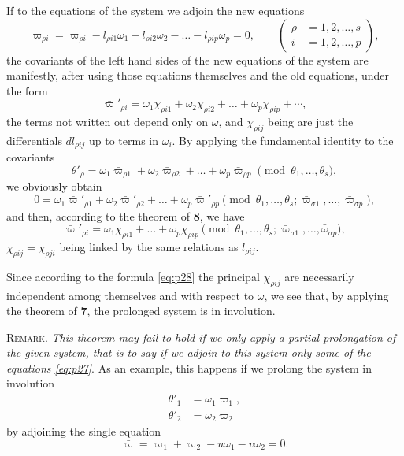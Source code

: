 \documentclass[leqno,11pt]{book}
\theoremstyle{shape1}
\theoremstyle{shapesmall}
\newcommand{\vp}{\varpi}
\newcommand{\somespace}{\vspace{9pt}}
\begin{document}
If to the equations of the system we adjoin the new equations
\begin{equation}
  \label{eq:p27}
  \bar\vp_{\rho i}=\vp_{\rho i}-l_{\rho i1}\omega_{1}-l_{\rho i2}\omega_{2}-\dots-l_{\rho ip}\omega_{p}=0,\qquad
  \left(\begin{aligned}
    \rho&=1,2,\dots,s\\
    i&=1,2,\dots,p
  \end{aligned}\right),
\end{equation}
the covariants of the left hand sides of the new equations of the system are manifestly, after using those equations themselves and the old equations, under the form
\begin{equation}
  \label{eq:p28}
  \bar\vp'_{\rho i}=\omega_{1}\chi_{\rho i1}+\omega_{2}\chi_{\rho i 2}+\dots+\omega_{p}\chi_{\rho ip}+\cdots,
\end{equation}
the terms not written out depend only on $\omega$, and $\chi_{\rho ij}$ being are just the differentials $dl_{\rho ij}$ up to terms in $\omega_{i}$. By applying the fundamental identity to the covariants
\[
\theta'_{\rho}=\omega_{1}\bar\vp_{\rho 1}+\omega_{2}\bar\vp_{\rho 2}+\dots+\omega_{p}\bar\vp_{\rho p}\pmod{\theta_{1},\dots,\theta_{s}},
\]
we obviously obtain
\[
0=\omega_{1}\bar\vp'_{\rho 1}+\omega_{2}\bar\vp'_{\rho 2}+\dots+\omega_{p}\bar\vp'_{\rho p}\pmod{\theta_{1},\dots,\theta_{s};\bar\vp_{\sigma 1},\dots,\bar\vp_{\sigma p}},
\]
and then, according to the theorem of \textsection\textbf{8}, we have
\begin{equation}
  \label{eq:p29}
  \bar\vp'_{\rho i}=\omega_{1}\chi_{\rho i1}+\dots+\omega_{p}\chi_{\rho ip}\pmod{\theta_{1},\dots,\theta_{s};\bar\vp_{\sigma 1},\dots,\bar\omega_{\sigma p}},
\end{equation}
$\chi_{\rho ij}=\chi_{\rho ji}$ being linked by the same relations as $l_{\rho ij}$.

Since according to the formula \eqref{eq:p28} the principal $\chi_{\rho ij}$ are necessarily independent among themselves and with respect to $\omega$, we see that, by applying the theorem of \textsection\textbf{7}, the prolonged system is in involution.

\somespace

\textsc{Remark.} \emph{This theorem may fail to hold if we only apply a partial prolongation of the given system, that is to say if we adjoin to this system only some of the equations \eqref{eq:p27}}. As an example, this happens if we prolong the system in involution
\begin{align*}
  \theta'_{1}&=\omega_{1}\vp_{1},\\
  \theta'_{2}&=\omega_{2}\vp_{2}
\end{align*}
by adjoining the single equation
\[
\bar\vp=\vp_{1}+\vp_{2}-u\omega_{1}-v\omega_{2}=0.
\]
\end{document}
